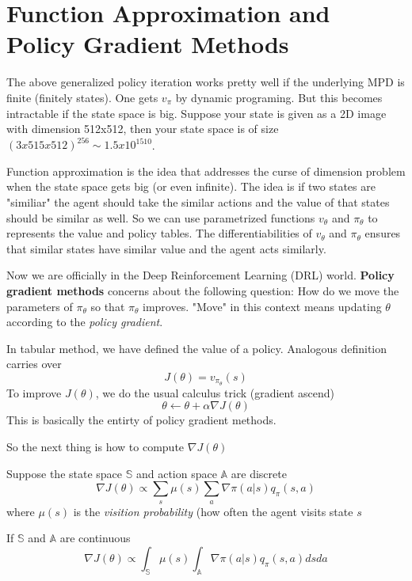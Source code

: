 \documentclass{article}
\begin{document}
\section{Function Approximation and Policy Gradient Methods}
The above generalized policy iteration works pretty well if the underlying
MPD is finite (finitely states). One gets $v_{\pi}$ by dynamic programing.
But this becomes intractable if the state space is big. Suppose your 
state is given as a 2D image with dimension 512x512, then your state
space is of size $(3x515x512)^{256} \sim 1.5x10^{1510}$. 

Function approximation is the idea that addresses the curse of dimension
problem when the state space gets big (or even infinite). The idea is 
if two states are "similiar" the agent should take the similar actions 
and the value of that states should be similar as well. So we can use
parametrized functions $v_{\theta}$ and $\pi_{\theta}$ to represents 
the value and policy tables. The differentiabilities of $v_{\theta}$ 
and $\pi_{\theta}$ ensures that similar states have similar value and 
the agent acts similarly. 

Now we are officially in the Deep Reinforcement Learning (DRL) world. 
\textbf{Policy gradient methods} concerns about the following question:
How do we move the parameters of $\pi_{\theta}$ so that $\pi_{\theta}$
improves. "Move" in this context means updating $\theta$ according to 
the \emph{policy gradient}. 

In tabular method, we have defined the value of a policy. Analogous 
definition carries over
\[
    J(\theta) = v_{\pi_{\theta}}(s)
\]
To improve $J(\theta)$, we do the usual calculus trick (gradient ascend)
\[
    \theta \leftarrow \theta + \alpha \nabla J(\theta)
\]
This is basically the entirty of policy gradient methods.

So the next thing is how to compute $\nabla J(\theta)$ 


\begin{theorem}
Suppose the state space $\mathbb{S}$ and action space $\mathbb{A}$ 
are discrete
\[
    \nabla J(\theta) \propto \sum_{s}\mu(s)\sum_{a} 
    \nabla \pi(a|s)q_{\pi}(s, a)
\]
where $\mu(s)$ is the \emph{visition probability} (how often the 
agent visits state $s$

If $\mathbb{S}$ and $\mathbb{A}$ are continuous
\[
    \nabla J(\theta) \propto \int_{\mathbb{S}}\mu(s)\int_{\mathbb{A}} 
    \nabla\pi(a|s)q_{\pi}(s, a) dsda
\]
\end{theorem}
\end{document}
